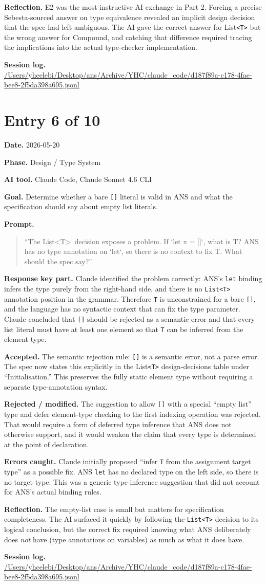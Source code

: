 \documentclass[11pt,a4paper]{article}
\newcommand{\code}[1]{\texttt{#1}}
\newcommand{\field}[2]{\textbf{#1.} #2\par}
\newcommand{\prompt}[1]{%
  \textbf{Prompt.}
  \begin{quote}\small #1\end{quote}
}
\newcommand{\sessionlog}[1]{\textbf{Session log.} \url{#1}\par}
\begin{document}
\field{Reflection}{E2 was the most instructive AI exchange in Part 2. Forcing a precise Sebesta-sourced answer on type equivalence revealed an implicit design decision that the spec had left ambiguous. The AI gave the correct answer for List\texttt{<T>} but the wrong answer for Compound, and catching that difference required tracing the implications into the actual type-checker implementation.}
\sessionlog{/Users/yhcelebi/Desktop/ans/Archive/YHC/claude_code/d187f89a-c178-4fae-bee8-2f5da398a695.jsonl}

\section{Entry 6 of 10}
\field{Date}{2026-05-20}
\field{Phase}{Design / Type System}
\field{AI tool}{Claude Code, Claude Sonnet 4.6 CLI}
\field{Goal}{Determine whether a bare \code{[]} literal is valid in ANS and what the specification should say about empty list literals.}
\prompt{``The List\textless T\textgreater\ decision exposes a problem. If `let x = []`, what is T? ANS has no type annotation on `let`, so there is no context to fix T. What should the spec say?''}
\field{Response key part}{Claude identified the problem correctly: ANS's \texttt{let} binding infers the type purely from the right-hand side, and there is no \texttt{List<T>} annotation position in the grammar. Therefore \texttt{T} is unconstrained for a bare \texttt{[]}, and the language has no syntactic context that can fix the type parameter. Claude concluded that \texttt{[]} should be rejected as a semantic error and that every list literal must have at least one element so that \texttt{T} can be inferred from the element type.}
\field{Accepted}{The semantic rejection rule: \texttt{[]} is a semantic error, not a parse error. The spec now states this explicitly in the List\texttt{<T>} design-decisions table under ``Initialisation.'' This preserves the fully static element type without requiring a separate type-annotation syntax.}
\field{Rejected / modified}{The suggestion to allow \texttt{[]} with a special ``empty list'' type and defer element-type checking to the first indexing operation was rejected. That would require a form of deferred type inference that ANS does not otherwise support, and it would weaken the claim that every type is determined at the point of declaration.}
\field{Errors caught}{Claude initially proposed ``infer \texttt{T} from the assignment target type'' as a possible fix. ANS \texttt{let} has no declared type on the left side, so there is no target type. This was a generic type-inference suggestion that did not account for ANS's actual binding rules.}
\field{Reflection}{The empty-list case is small but matters for specification completeness. The AI surfaced it quickly by following the \texttt{List<T>} decision to its logical conclusion, but the correct fix required knowing what ANS deliberately does \emph{not} have (type annotations on variables) as much as what it does have.}
\sessionlog{/Users/yhcelebi/Desktop/ans/Archive/YHC/claude_code/d187f89a-c178-4fae-bee8-2f5da398a695.jsonl}
\end{document}
